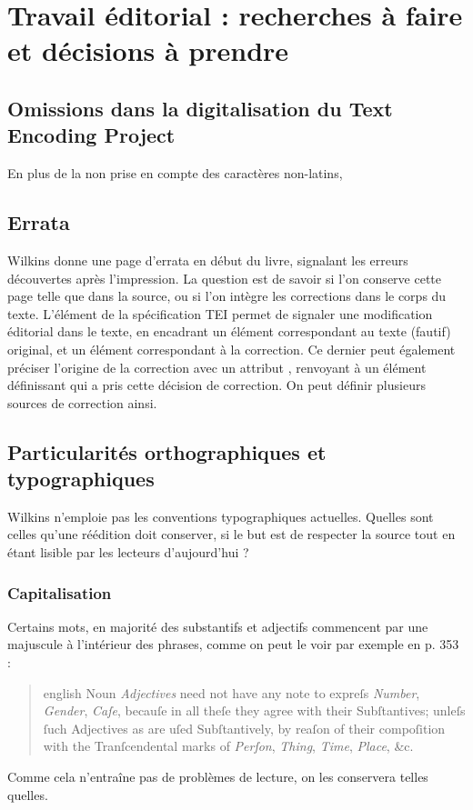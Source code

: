 \section{Travail éditorial : recherches à faire et décisions à prendre}\label{MethodTrav}
\subsection{Omissions dans la digitalisation du Text Encoding Project}
En plus de la non prise en compte des caractères non-latins, 
\subsection{Errata}
Wilkins donne une page d'errata en début du livre, signalant les erreurs découvertes après l'impression.
La question est de savoir si l'on conserve cette page telle que dans la source, ou si l'on intègre les corrections dans le corps du texte.
L'élément  de la spécification TEI permet de signaler une modification éditorial dans le texte, en encadrant un élément  correspondant au texte (fautif) original, et un élément  correspondant à la correction.
Ce dernier peut également préciser l'origine de la correction avec un attribut , renvoyant à un élément  définissant qui a pris cette décision de correction.
On peut définir plusieurs sources de correction ainsi.
\subsection{Particularités orthographiques et typographiques}
Wilkins n'emploie pas les conventions typographiques actuelles.
Quelles sont celles qu'une réédition doit conserver, si le but est de respecter la source tout en étant lisible par les lecteurs d'aujourd'hui ?
\subsubsection{Capitalisation}
Certains mots, en majorité des substantifs et adjectifs commencent par une majuscule à l'intérieur des phrases, comme on peut le voir par exemple en p. 353 :
\begin{quotation}
\begin{otherlanguage*}{english}
Noun \emph{Adjectives} need not have any note to expreſs \emph{Number}, \emph{Gender}, \emph{Caſe}, becauſe in all theſe they agree with their Subſtantives; unleſs ſuch Adjectives as are uſed Subſtantively, by reaſon of their compoſition with the Tranſcendental marks of \emph{Perſon}, \emph{Thing}, \emph{Time}, \emph{Place}, \&c.
\end{otherlanguage*}
\end{quotation}
Comme cela n'entraîne pas de problèmes de lecture, on les conservera telles quelles.
